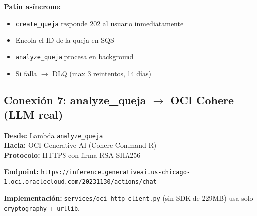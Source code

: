 \documentclass[11pt,a4paper]{article}
\begin{document}
\begin{center}
\end{center}

\textbf{Pat\'in as\'incrono:}
\begin{itemize}[leftmargin=*]
  \item \texttt{create\_queja} responde 202 al usuario inmediatamente
  \item Encola el ID de la queja en SQS
  \item \texttt{analyze\_queja} procesa en background
  \item Si falla $\rightarrow$ DLQ (max 3 reintentos, 14 d\'ias)
\end{itemize}

\subsection{Conexi\'on 7: analyze\_queja $\rightarrow$ OCI Cohere (LLM real)}

\begin{tcolorbox}[colback=orange!5, colframe=ocired, title=\textbf{Desde $\rightarrow$ Hasta}]
\textbf{Desde:} Lambda \texttt{analyze\_queja} \\
\textbf{Hacia:} OCI Generative AI (Cohere Command R) \\
\textbf{Protocolo:} HTTPS con firma RSA-SHA256
\end{tcolorbox}

\begin{center}
\end{center}

\textbf{Endpoint:} \texttt{https://inference.generativeai.us-chicago-1.oci.oraclecloud.com/20231130/actions/chat}

\textbf{Implementaci\'on:} \texttt{services/oci\_http\_client.py} (sin SDK de 229MB)
usa solo \texttt{cryptography} + \texttt{urllib}.
\end{document}
